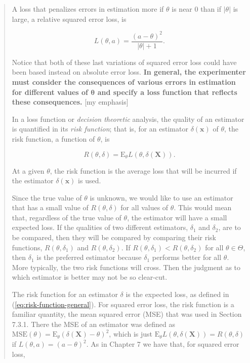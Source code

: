 \documentclass[english]{article}
\begin{document}
\begin{quote}
A loss that penalizes errors in estimation more if $\theta$ is near
0 than if $|\theta|$ is large, a relative squared error loss, is

\[
L(\theta,a)=\dfrac{(a-\theta)^{2}}{|\theta|+1}.
\]

Notice that both of these last variations of squared error loss could
have been based instead on absolute error loss. \textbf{In general,
the experimenter must consider the consequences of various errors
in estimation for different values of $\boldsymbol{\theta}$ and specify
a loss function that reflects these consequences.} {[}my emphasis{]}

In a loss function or \textit{decision theoretic} analysis, the quality
of an estimator is quantified in its \textit{risk function}; that
is, for an estimator $\delta(\mathbf{x})$ of $\theta$, the risk
function, a function of $\theta$, is

\begin{equation}
R(\theta,\delta)=\mathrm{E}_{\theta}L(\theta,\delta(\mathbf{X})).\label{eq:risk-function-general}
\end{equation}

At a given $\theta$, the risk function is the average loss that will
be incurred if the estimator $\delta(\mathbf{x})$ is used.

Since the true value of $\theta$ is unknown, we would like to use
an estimator that has a small value of $R(\theta,\delta)$ for all
values of $\theta$. This would mean that, regardless of the true
value of $\theta$, the estimator will have a small expected loss.
If the qualities of two different estimators, $\delta_{1}$ and $\delta_{2}$,
are to be compared, then they will be compared by comparing their
risk functions, $R(\theta,\delta_{1})$ and $R(\theta,\delta_{2})$.
If $R(\theta,\delta_{1})<R(\theta,\delta_{2})$ for all $\theta\in\Theta$,
then $\delta_{1}$ is the preferred estimator because $\delta_{1}$
performs better for all $\theta$. More typically, the two risk functions
will cross. Then the judgment as to which estimator is better may
not be so clear-cut.

The risk function for an estimator $\delta$ is the expected loss,
as defined in (\ref{eq:risk-function-general}). For squared error
loss, the risk function is a familiar quantity, the mean squared error
(MSE) that was used in Section 7.3.1. There the MSE of an estimator
was defined as $\mathrm{MSE}(\theta)=\mathrm{E}_{\theta}(\delta(\mathbf{X})-\theta)^{2}$,
which is just $\mathrm{E}_{\theta}L(\theta,\delta(\mathbf{X}))=R(\theta,\delta)$
if $L(\theta,a)=(a-\theta)^{2}$. As in Chapter 7 we have that, for
squared error loss,


\end{quote}
\end{document}
